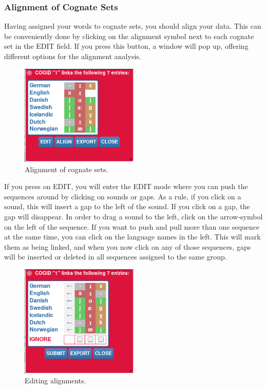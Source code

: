 \documentclass[a4paper,svgnames]{scrartcl}
\begin{document}
\subsubsection*{Alignment of Cognate
Sets}\label{alignment-of-cognate-sets}

Having assigned your words to cognate sets, you should align your data.
This can be conveniently done by clicking on the alignment symbol next
to each cognate set in the EDIT field. If you press this button, a
window will pop up, offering different options for the alignment
analysis.

\begin{figure}
\centering
\includegraphics[width=0.5\textwidth]{images/figure-10.png}
\caption{Alignment of cognate sets.}
\end{figure}

If you press on EDIT, you will enter the EDIT mode where you can push
the sequences around by clicking on sounds or gaps. As a rule, if you
click on a sound, this will insert a gap to the left of the sound. If
you click on a gap, the gap will disappear. In order to drag a sound to
the left, click on the arrow-symbol on the left of the sequence. If you
want to push and pull more than one sequence at the same time, you can
click on the language names in the left. This will mark them as being
linked, and when you now click on any of those sequences, gaps will be
inserted or deleted in all sequences assigned to the same group.

\begin{figure}
\centering
\includegraphics[width=0.5\textwidth]{images/figure-11.png}
\caption{Editing alignments.}
\end{figure}
\end{document}
